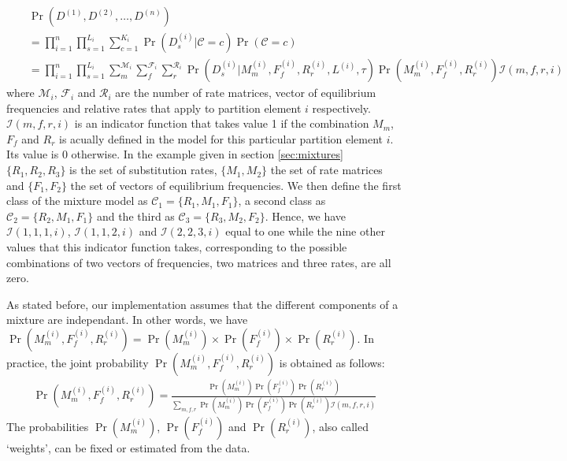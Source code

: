 \documentclass[a4paper,12pt]{article}
\begin{document}
\begin{eqnarray*}
&& \Pr(D^{(1)},D^{(2)},\ldots,D^{(n)})  \\
&&=  \prod_{i=1}^{n}  \prod_{s=1}^{L_i} \sum_{c=1}^{K_i} \Pr(D^{(i)}_s|\mathcal{C}=c) \Pr(\mathcal{C}=c) \\
&&= \prod_{i=1}^{n}  \prod_{s=1}^{L_i} \sum_{m}^{\mathcal{M}_i} \sum_{f}^{\mathcal{F}_i} \sum_{r}^{\mathcal{R}_i}  \Pr(D^{(i)}_s|M_m^{(i)},F_f^{(i)},R_r^{(i)},L^{(i)},\tau) \Pr(M_m^{(i)},F_f^{(i)},R_r^{(i)}) \mathcal{I}(m,f,r,i)
\end{eqnarray*} 
where $\mathcal{M}_i$, $\mathcal{F}_i$ and $\mathcal{R}_i$ are the number of rate matrices,
vector of equilibrium frequencies and relative rates that apply to partition element $i$
respectively. $\mathcal{I}(m,f,r,i)$ is an indicator function that takes value 1 if the combination
$M_m$, $F_f$ and $R_r$ is acually defined in the model for this particular partition element
$i$. Its value is 0 otherwise. In the example given in section \ref{sec:mixtures} $\{R_1,R_2,R_3\}$
is the  set of substitution  rates, $\{M_1,M_2\}$ the set of rate matrices and $\{F_1,F_2\}$ the set  of vectors of equilibrium frequencies.  We then
define the first class of the mixture model  as $\mathcal{C}_1 = \{R_1,M_1,F_1\}$, a second class as
$\mathcal{C}_2  = \{R_2,M_1,F_1\}$ and the third as $\mathcal{C}_3  = \{R_3,M_2,F_2\}$. Hence, we
have $\mathcal{I}(1,1,1,i)$, $\mathcal{I}(1,1,2,i)$ and $\mathcal{I}(2,2,3,i)$ equal to one while
the nine other values that this indicator function takes, corresponding to the possible combinations of
two vectors of frequencies, two  matrices and three rates, are all zero.

As stated before, our implementation assumes that the different components of a mixture are
independant. In other words, we have $\Pr(M_m^{(i)},F_f^{(i)},R_r^{(i)}) = \Pr(M_m^{(i)}) \times
\Pr(F_f^{(i)}) \times \Pr(R_r^{(i)})$. In practice, the joint probability
$\Pr(M_m^{(i)},F_f^{(i)},R_r^{(i)})$ is obtained as follows:
\begin{eqnarray}\label{equ:weights}
\Pr(M_m^{(i)},F_f^{(i)},R_r^{(i)}) = \frac{\Pr(M_m^{(i)}) \Pr(F_f^{(i)}) \Pr(R_r^{(i)})}{
  \sum_{m,f,r} \Pr(M_m^{(i)}) \Pr(F_f^{(i)}) \Pr(R_r^{(i)}) \mathcal{I}(m,f,r,i)}
\end{eqnarray}
The probabilities $\Pr(M_m^{(i)})$, $\Pr(F_f^{(i)})$ and $\Pr(R_r^{(i)})$, also called `weights', can be fixed or estimated
from the data.
\end{document}
